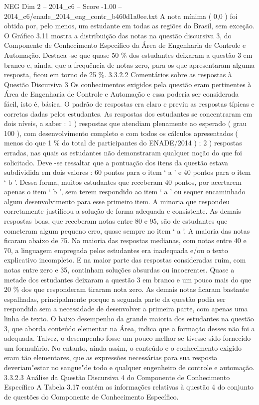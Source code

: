 \begin{textsample}{NEG Dim 2 – 2014\_c6 – Score -1.00 – 2014\_c6/enade\_2014\_eng\_contr\_b460d1a0ee.txt}
A nota mínima ( 0,0 ) foi obtida por, pelo menos, um estudante em todas as regiões do Brasil, sem exceção.
O Gráfico 3.11 mostra a distribuição das notas na questão discursiva 3, do Componente de Conhecimento Específico da Área de Engenharia de Controle e Automação.
Destaca -se que quase 50 \% dos estudantes deixaram a questão 3 em branco e, ainda, que a frequência de notas zero, para os que apresentaram alguma resposta, ficou em torno de 25 \%. 3.3.2.2 Comentários sobre as respostas à Questão Discursiva 3 Os conhecimentos exigidos pela questão eram pertinentes à Área de Engenharia de Controle e Automação e essa poderia ser considerada fácil, isto é, básica.
O padrão de respostas era claro e previu as respostas típicas e corretas dadas pelos estudantes.
As respostas dos estudantes se concentraram em dois níveis, a saber : 1 ) respostas que atendiam plenamente ao esperado ( grau 100 ), com desenvolvimento completo e com todos os cálculos apresentados ( menos do que 1 \% do total de participantes do ENADE/2014 ) ; 2 ) respostas erradas, nas quais os estudantes não demonstraram qualquer noção do que foi solicitado.
Deve -se ressaltar que a pontuação dos itens da questão estava subdividida em dois valores : 60 pontos para o item ‘ a ’ e 40 pontos para o item ‘ b ’.
Dessa forma, muitos estudantes que receberam 40 pontos, por acertarem apenas o item ‘ b ’, sem terem respondido ao item ‘ a ’ ou sequer encaminhado algum desenvolvimento para esse primeiro item.
A minoria que respondeu corretamente justificou a solução de forma adequada e consistente.
As demais respostas boas, que receberam notas entre 80 e 95, são de estudantes que cometeram algum pequeno erro, quase sempre no item ‘ a ’.
A maioria das notas ficaram abaixo de 75.
Na maioria das respostas medianas, com notas entre 40 e 70, a linguagem empregada pelos estudantes era inadequada e/ou o texto explicativo incompleto.
E na maior parte das respostas consideradas ruim, com notas entre zero e 35, continham soluções absurdas ou incoerentes.
Quase a metade dos estudantes deixaram a questão 3 em branco e um pouco mais do que 20 \% dos que responderam tiraram nota zero.
As demais notas ficaram bastante espalhadas, principalmente porque a segunda parte da questão podia ser respondida sem a necessidade de desenvolver a primeira parte, com apenas uma linha de texto.
O baixo desempenho da grande maioria dos estudantes na questão 3, que aborda conteúdo elementar na Área, indica que a formação desses não foi a adequada.
Talvez, o desempenho fosse um pouco melhor se tivesse sido fornecido um formulário.
No entanto, ainda assim, o conteúdo e o conhecimento exigido eram tão elementares, que as expressões necessárias para sua resposta deveriam"estar no sangue"de todo e qualquer engenheiro de controle e automação. 3.3.2.3 Análise da Questão Discursiva 4 do Componente de Conhecimento Específico A Tabela 3.17 contém as informações relativas à questão 4 do conjunto de questões do Componente de Conhecimento Específico.

\end{textsample}
